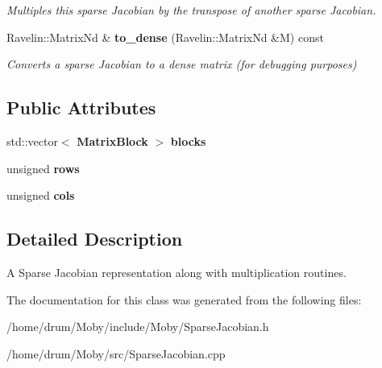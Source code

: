 \begin{DoxyCompactItemize}
\begin{DoxyCompactList}\small\item\em Multiples this sparse Jacobian by the transpose of another sparse Jacobian. \end{DoxyCompactList}\item 
Ravelin\-::\-Matrix\-Nd \& {\bf to\-\_\-dense} (Ravelin\-::\-Matrix\-Nd \&M) const \label{classMoby_1_1SparseJacobian_a14a24234cbdffea0932d87429a8b3894}

\begin{DoxyCompactList}\small\item\em Converts a sparse Jacobian to a dense matrix (for debugging purposes) \end{DoxyCompactList}\end{DoxyCompactItemize}
\subsection*{Public Attributes}
\begin{DoxyCompactItemize}
\item 
std\-::vector$<$ {\bf Matrix\-Block} $>$ {\bfseries blocks}\label{classMoby_1_1SparseJacobian_aa936e2f4139757a34b44276c3b42f03c}

\item 
unsigned {\bfseries rows}\label{classMoby_1_1SparseJacobian_a920752c96655a2bbfd8869f62665c2b9}

\item 
unsigned {\bfseries cols}\label{classMoby_1_1SparseJacobian_aa1a371cfee664e89cdbf2226714ed3a9}

\end{DoxyCompactItemize}


\subsection{Detailed Description}
A Sparse Jacobian representation along with multiplication routines. 

The documentation for this class was generated from the following files\-:\begin{DoxyCompactItemize}
\item 
/home/drum/\-Moby/include/\-Moby/Sparse\-Jacobian.\-h\item 
/home/drum/\-Moby/src/Sparse\-Jacobian.\-cpp\end{DoxyCompactItemize}
